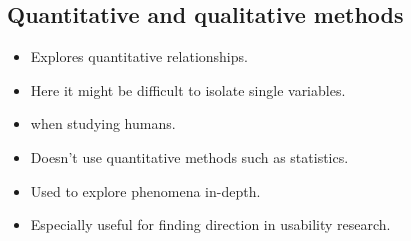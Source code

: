 \subsection{Quantitative and qualitative methods}

\begin{frame}
  \begin{definition}
    \begin{itemize}
      \item Explores quantitative relationships.
      \item Here it might be difficult to isolate single variables.
      \item \Eg when studying humans.
    \end{itemize}
  \end{definition}

  \begin{definition}
    \begin{itemize}
      \item Doesn't use quantitative methods such as statistics.
      \item Used to explore phenomena in-depth.
      \item Especially useful for finding direction in usability research.
    \end{itemize}
  \end{definition}
\end{frame}




\begin{frame}[allowframebreaks]
  \small
  \printbibliography{}
\end{frame}

